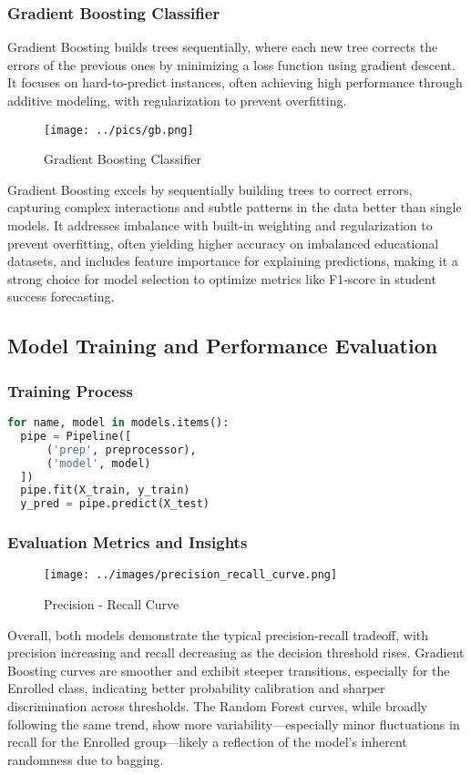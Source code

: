 \documentclass[twoside,final]{hcmut-report}
\begin{document}
\subsubsection*{Gradient Boosting Classifier}
Gradient Boosting builds trees sequentially, where each new tree corrects the errors of the previous ones by minimizing a loss function using gradient descent. It focuses on hard-to-predict instances, often achieving high performance through additive modeling, with regularization to prevent overfitting.
\begin{figure}[H]
  \centering
  \texttt{[image: ../pics/gb.png]}
  \caption{Gradient Boosting Classifier}
  \label{gb_clf}
\end{figure}
Gradient Boosting excels by sequentially building trees to correct errors, capturing complex interactions and subtle patterns in the data better than single models. It addresses imbalance with built-in weighting and regularization to prevent overfitting, often yielding higher accuracy on imbalanced educational datasets, and includes feature importance for explaining predictions, making it a strong choice for model selection to optimize metrics like F1-score in student success forecasting.
\subsection{Model Training and Performance Evaluation}
\subsubsection*{Training Process}
\begin{lstlisting}[language=python]
for name, model in models.items():
  pipe = Pipeline([
      ('prep', preprocessor),
      ('model', model)
  ])
  pipe.fit(X_train, y_train)
  y_pred = pipe.predict(X_test)
\end{lstlisting}
\subsubsection*{Evaluation Metrics and Insights}
\begin{figure}[H]
  \centering
  \texttt{[image: ../images/precision\_recall\_curve.png]}
  \caption{Precision - Recall Curve}
  \label{pr_curve}
\end{figure}
Overall, both models demonstrate the typical precision-recall tradeoff, with precision increasing and recall decreasing as the decision threshold rises. Gradient Boosting curves are smoother and exhibit steeper transitions, especially for the Enrolled class, indicating better probability calibration and sharper discrimination across thresholds. The Random Forest curves, while broadly following the same trend, show more variability—especially minor fluctuations in recall for the Enrolled group—likely a reflection of the model's inherent randomness due to bagging.\\
\end{document}

